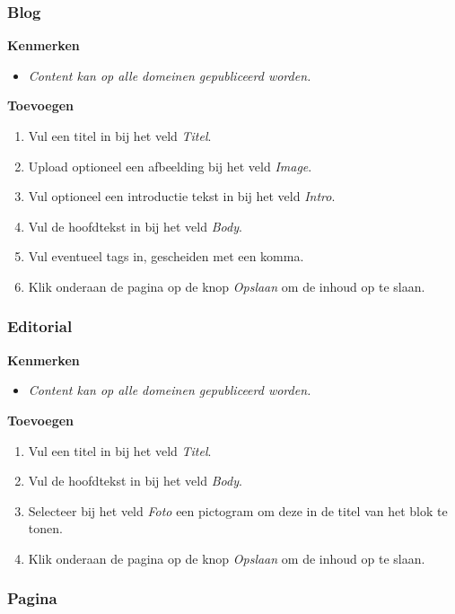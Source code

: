 \subsubsection{Blog}\label{blog}

\textbf{Kenmerken}

\begin{itemize}
\item \emph{Content kan op alle domeinen gepubliceerd worden.}
\end{itemize}

\textbf{Toevoegen}

\begin{enumerate}
\item Vul een titel in bij het veld \emph{Titel}.
\item Upload optioneel een afbeelding bij het veld \emph{Image}.
\item Vul optioneel een introductie tekst in bij het veld \emph{Intro}.
\item Vul de hoofdtekst in bij het veld \emph{Body}.
\item Vul eventueel tags in, gescheiden met een komma.
\item Klik onderaan de pagina op de knop \emph{Opslaan} om de inhoud op te slaan.
\end{enumerate}

\subsubsection{Editorial}\label{editorial}

\textbf{Kenmerken}

\begin{itemize}
\item \emph{Content kan op alle domeinen gepubliceerd worden.}
\end{itemize}

\textbf{Toevoegen}

\begin{enumerate}
\item Vul een titel in bij het veld \emph{Titel}.
\item Vul de hoofdtekst in bij het veld \emph{Body}.
\item Selecteer bij het veld \emph{Foto} een pictogram om deze in de titel van het blok te tonen.
\item Klik onderaan de pagina op de knop \emph{Opslaan} om de inhoud op te slaan.
\end{enumerate}

\subsubsection{Pagina}\label{eenvoudigepagina}

